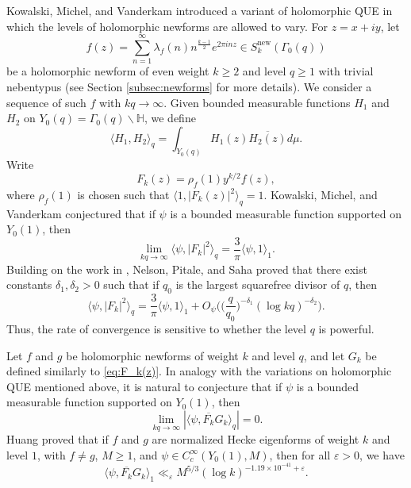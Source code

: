 \documentclass[12pt,reqno]{amsart}
\theoremstyle{remark}
\newcommand{\h}{\mathbb{H}}
\newcommand{\bs}{\backslash}
\numberwithin{equation}{section}
\begin{document}
    Kowalski, Michel, and Vanderkam \cite[Conjecture 1.4]{KMV} introduced a variant of holomorphic QUE in which the levels of holomorphic newforms are allowed to vary.  For $z=x+iy$, let
    \[
        f(z) = \sum_{n=1}^{\infty}\lambda_f(n)n^{\frac{k-1}{2}}e^{2\pi i n z}\in S_k^{\mathrm{new}}(\Gamma_0(q))
    \]
    be a holomorphic newform of even weight $k\geq 2$ and level $q\geq 1$ with trivial nebentypus (see Section \ref{subsec:newforms} for more details).  We consider a sequence of such $f$ with $kq\to\infty$. Given bounded measurable functions $H_1$ and $H_2$ on  $Y_0(q)=\Gamma_0(q)\bs\h$, we define 
    \begin{equation}
        \label{eq:Petersson}
     \langle H_1, H_2\rangle_q = \int_{Y_0(q)}H_1(z)\overline{H_2(z)} d\mu.
    \end{equation}
    Write
    \begin{equation}
    \label{eq:F_k(z)}
        F_k(z) = \rho_f(1)y^{k/2}f(z),
    \end{equation}
    where $\rho_f(1)$ is chosen such that $ \langle 1, |F_k(z)|^2 \rangle_q = 1$. 
    Kowalski, Michel, and Vanderkam conjectured that if $\psi$ is a bounded measurable function supported on $Y_0(1)$, then
    \begin{equation}
    \label{eq:hQUEstatement}
        \lim_{kq \to \infty}\langle \psi, |F_k|^2 \rangle_q = \frac{3}{\pi}\langle \psi, 1\rangle_1.
    \end{equation}
    Building on the work in \cite{H,HS,S}, Nelson, Pitale, and Saha \cite{N,NPS} proved that there exist constants $\delta_1,\delta_2>0$ such that if $q_0$ is the largest squarefree divisor of $q$, then
    \[
      \langle \psi, |F_k|^2 \rangle_q = \frac{3}{\pi} \langle \psi, 1 \rangle_1 + O_{\psi}\Big(\Big(\frac{q}{q_0}\Big)^{-\delta_1}(\log kq)^{-\delta_2}\Big).
    \]
    Thus, the rate of convergence is sensitive to whether the level $q$ is powerful.

    Let $f$ and $g$ be holomorphic newforms of weight $k$ and level $q$, and let $G_k$ be defined similarly to \eqref{eq:F_k(z)}.
     In analogy with the variations on holomorphic QUE mentioned above, it is natural to conjecture that if $\psi$ is a bounded measurable function supported on $Y_0(1)$, then
    \begin{equation}
        \label{eq:decorrelation}
            \lim_{kq \to \infty} |\langle \psi, \overline{F_k}G_k \rangle_q| = 0.
    \end{equation}
    Huang \cite{H} proved that if $f$ and $g$ are normalized Hecke eigenforms of weight $k$ and level $1$, with $f\neq g$, $M\geq 1$, and $\psi \in C_{c}^{\infty}(Y_0(1),M)$, then for all $\varepsilon>0$, we have
    \begin{equation}
        \label{eq:Huang-decor}
             \langle \psi, \overline{F_k}G_k \rangle_1  \ll_\varepsilon M^{5/3}(\log k)^{-1.19\times 10^{-41} +\varepsilon}.
    \end{equation}
\end{document}
